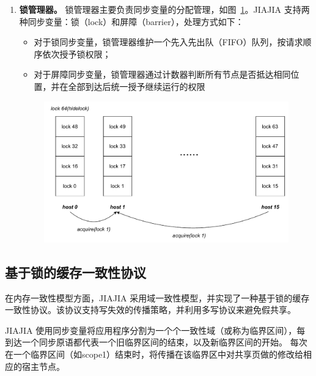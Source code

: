 {\begin{enumerate}[label=\arabic*.]
        \item \textbf{锁管理器。}
              锁管理器主要负责同步变量的分配管理，如图~\ref{fig:JIAJIA-lock-manager}。JIAJIA 支持两种同步变量：锁（lock）和屏障（barrier），处理方式如下：
              \begin{itemize}
                  \item 对于锁同步变量，锁管理器维护一个先入先出队（FIFO）队列，按请求顺序依次授予锁权限；
                  \item 对于屏障同步变量，锁管理器通过计数器判断所有节点是否抵达相同位置，并在全部到达后统一授予继续运行的权限
              \end{itemize}
              \begin{figure}[!htbp]
                  \centering
                  \includegraphics[width=1.0\textwidth]{Img/JIAJIA锁管理器.drawio.pdf}
                  \label{fig:JIAJIA-lock-manager}
              \end{figure}
    \end{enumerate}

    \subsection{基于锁的缓存一致性协议}
    在内存一致性模型方面，JIAJIA 采用域一致性模型，并实现了一种基于锁的缓存一致性协议。该协议支持写失效的传播策略，并利用多写协议来避免假共享。

    JIAJIA 使用同步变量将应用程序分割为一个个一致性域（或称为临界区间），每到达一个同步原语都代表一个旧临界区间的结束，以及新临界区间的开始。
    每次在一个临界区间（如scope1）结束时，将传播在该临界区中对共享页做的修改给相应的宿主节点。

}
